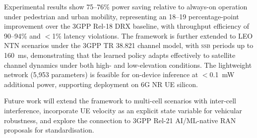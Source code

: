 \documentclass[conference]{IEEEtran}
\newcommand{\ssb}{\textsc{ssb}}
\newcommand{\TODO}[1]{\textcolor{red}{\textbf{[TODO: #1]}}}
\begin{document}
Experimental results show 75--76\% power saving relative to always-on
operation under pedestrian and urban mobility, representing an 18--19
percentage-point improvement over the 3GPP Rel-18 DRX baseline,
with throughput efficiency of 90--94\% and $<$1\% latency violations.
The framework is further extended to LEO NTN scenarios under the 3GPP
TR 38.821 channel model, with \ssb{} periods up to 160~ms,
demonstrating that the learned policy adapts effectively to satellite
channel dynamics under both high- and low-elevation conditions.
The lightweight network (5,953 parameters) is feasible for on-device
inference at $<$0.1~mW additional power, supporting deployment on
6G NR UE silicon.

Future work will extend the framework to multi-cell scenarios with
inter-cell interference, incorporate UE velocity as an explicit state
variable for vehicular robustness, and explore the connection to
3GPP Rel-21 AI/ML-native RAN proposals for standardisation.




\end{document}
